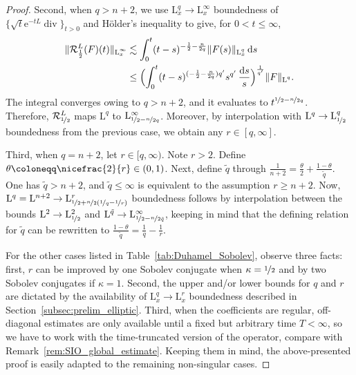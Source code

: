 \documentclass[11pt, leqno]{amsart}
\theoremstyle{definition}
\renewcommand{\L}{\mathrm{L}}
\newcommand{\Sol}{\mathcal{R}}
\newcommand{\e}{\mathrm{e}}
\renewcommand{\d}{\,\mathrm{d}}
\newcommand{\dds}{\,\frac{\mathrm{d}s}{s}}
\DeclareMathOperator{\Div}{div}
\begin{document}
\begin{proof}
		Second, when $q > n+2$, we use $\L^q_x \to \L^\infty_x$ boundedness of $\{ \sqrt{t} \e^{-tL} \Div \}_{t>0}$ and Hölder's inequality to give, for $0 < t \leq \infty$,
		\begin{align}
			\| \Sol^L_\frac{1}{2}(F)(t) \|_{\L^{\vphantom{q}\infty}_x} &\lesssim \int_0^t (t-s)^{- \frac{1}{2} - \frac{n}{2q}} \| F(s) \|_{\L^{q}_x} \d s \\
			&\leq \Bigl( \int_0^t (t-s)^{(- \frac{1}{2} - \frac{n}{2q})q'} s^{q'} \dds \Bigr)^\frac{1}{q'} \| F \|_{\L^q_{\vphantom{x}}}.
		\end{align}
		The integral converges owing to $q > n+2$, and it evaluates to $t^{\nicefrac{1}{2} - \nicefrac{n}{2q}}$. Therefore, $\Sol^L_{\nicefrac{1}{2}}$ maps $\L^q$ to $\L^\infty_{\nicefrac{1}{2} - \nicefrac{n}{2q}}$. Moreover, by interpolation with $\L^q \to \L^q_{\nicefrac{1}{2}}$ boundedness from the previous case, we obtain any $r \in [q, \infty]$.

		Third, when $q = n+2$, let $r\in [q,\infty)$. Note $r > 2$. Define $\theta \coloneqq \nicefrac{2}{r} \in (0,1)$. Next, define $\tilde q$ through $\frac{1}{n+2} = \frac{\theta}{2} + \frac{1-\theta}{\tilde q}$. One has $\tilde q > n+2$, and $\tilde q \leq \infty$ is equivalent to the assumption $r \geq n+2$. Now, $\L^q = \L^{n+2} \to \L^r_{\nicefrac{1}{2} + \nicefrac{n}{2}(\nicefrac{1}{q} - \nicefrac{1}{r})}$ boundedness follows by interpolation between the bounds $\L^2 \to \L^2_{\nicefrac{1}{2}}$ and $\L^{\tilde q} \to \L^\infty_{\nicefrac{1}{2} - \nicefrac{n}{2\tilde q}}$, keeping in mind that the defining relation for $\tilde q$ can be rewritten to $\frac{1-\theta}{\tilde q} = \frac{1}{q} - \frac{1}{r}$.

		For the other cases listed in Table~\ref{tab:Duhamel_Sobolev}, observe three facts: first, $r$ can be improved by one Sobolev conjugate when $\kappa = \nicefrac{1}{2}$ and by two Sobolev conjugates if $\kappa = 1$. Second, the upper and/or lower bounds for $q$ and $r$ are dictated by the availability of $\L^q_x \to \L^r_x$ boundedness described in Section~\ref{subsec:prelim_elliptic}. Third, when the coefficients are regular, off-diagonal estimates are only available until a fixed but arbitrary time $T < \infty$, so we have to work with the time-truncated version of the operator, compare with Remark~\ref{rem:SIO_global_estimate}. Keeping them in mind, the above-presented proof is easily adapted to the remaining non-singular cases.


\end{proof}
\end{document}
